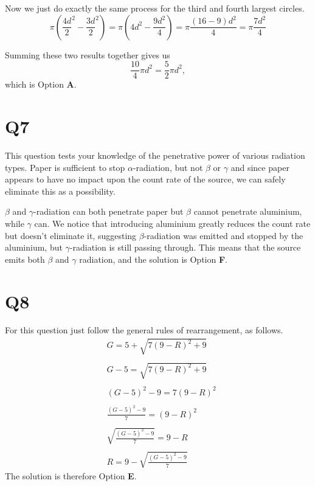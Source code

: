 \documentclass[11pt]{article}
\begin{document}
Now we just do exactly the same process for the third and fourth largest circles.
\begin{equation*}
\pi(\frac{4d}{2}^2 - \frac{3d}{2}^2) = \pi(4d^2 - \frac{9d^2}{4}) = \pi \frac{(16-9)d^2}{4} = \pi \frac{7d^2}{4}
\end{equation*}

Summing these two results together gives us
\begin{equation}
\frac{10}{4}\pi d^2 = \frac{5}{2} \pi d^2,
\end{equation}
which is Option \textbf{A}.

\section*{Q7}
This question tests your knowledge of the penetrative power of various radiation types.  Paper is sufficient to stop $\alpha$-radiation, but not $\beta$ or $\gamma$ and since paper appears to have no impact upon the count rate of the source, we can safely eliminate this as a possibility.

$\beta$ and $\gamma$-radiation can both penetrate paper but $\beta$ cannot penetrate aluminium, while $\gamma$ can.  We notice that introducing aluminium greatly reduces the count rate but doesn't eliminate it, suggesting $\beta$-radiation was emitted and stopped by the aluminium, but $\gamma$-radiation is still passing through.  This means that the source emits both $\beta$ and $\gamma$ radiation, and the solution is Option \textbf{F}.

\section*{Q8}
For this question just follow the general rules of rearrangement, as follows.
\begin{equation*}
\begin{aligned}
&G = 5+\sqrt{7(9-R)^2 + 9} \\\\
&G-5 = \sqrt{7(9-R)^2 + 9} \\\\
&(G-5)^2 - 9 = 7(9-R)^2\\\\
&\frac{(G-5)^2 -9}{7} = (9-R)^2\\\\
&\sqrt{\frac{(G-5)^2 -9}{7}} = 9-R\\\\
&R = 9 - \sqrt{\frac{(G-5)^2 -9}{7}}
\end{aligned}
\end{equation*}
The solution is therefore Option \textbf{E}.
\end{document}
